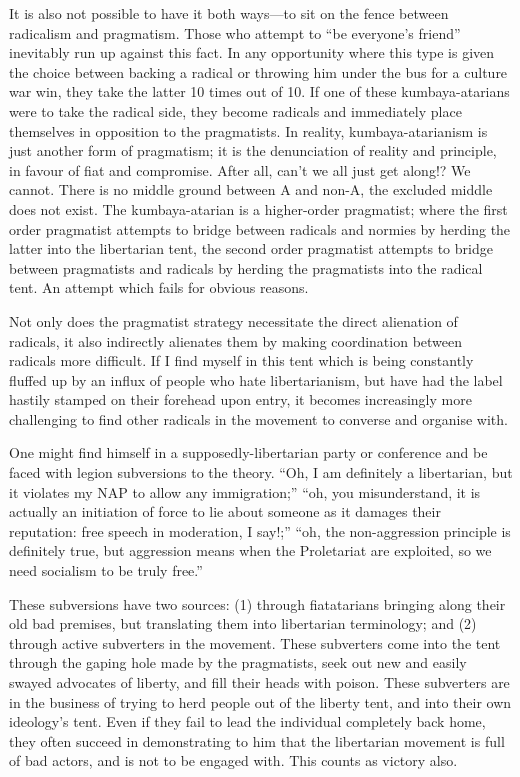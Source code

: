 \documentclass[11pt]{article}
\begin{document}
It is also not possible to have it both ways---to sit on the fence between radicalism and pragmatism. Those who attempt to ``be everyone's friend'' inevitably run up against this fact. In any opportunity where this type is given the choice between backing a radical or throwing him under the bus for a culture war win, they take the latter 10 times out of 10. If one of these kumbaya-atarians were to take the radical side, they become radicals and immediately place themselves in opposition to the pragmatists. In reality, kumbaya-atarianism is just another form of pragmatism; it is the denunciation of reality and principle, in favour of fiat and compromise. After all, can't we all just get along!? We cannot. There is no middle ground between A and non-A, the excluded middle does not exist. The kumbaya-atarian is a higher-order pragmatist; where the first order pragmatist attempts to bridge between radicals and normies by herding the latter into the libertarian tent, the second order pragmatist attempts to bridge between pragmatists and radicals by herding the pragmatists into the radical tent. An attempt which fails for obvious reasons.

Not only does the pragmatist strategy necessitate the direct alienation of radicals, it also indirectly alienates them by making coordination between radicals more difficult. If I find myself in this tent which is being constantly fluffed up by an influx of people who hate libertarianism, but have had the label hastily stamped on their forehead upon entry, it becomes increasingly more challenging to find other radicals in the movement to converse and organise with.

One might find himself in a supposedly-libertarian party or conference and be faced with legion subversions to the theory. ``Oh, I am definitely a libertarian, but it violates my NAP to allow any immigration;'' ``oh, you misunderstand, it is actually an initiation of force to lie about someone as it damages their reputation: free speech in moderation, I say!;'' ``oh, the non-aggression principle is definitely true, but aggression means when the Proletariat are exploited, so we need socialism to be truly free.''

These subversions have two sources: (1) through fiatatarians bringing along their old bad premises, but translating them into libertarian terminology; and (2) through active subverters in the movement. These subverters come into the tent through the gaping hole made by the pragmatists, seek out new and easily swayed advocates of liberty, and fill their heads with poison. These subverters are in the business of trying to herd people out of the liberty tent, and into their own ideology's tent. Even if they fail to lead the individual completely back home, they often succeed in demonstrating to him that the libertarian movement is full of bad actors, and is not to be engaged with. This counts as victory also.
\end{document}
